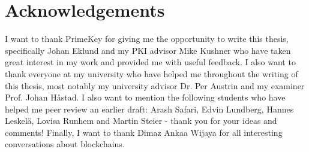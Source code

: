 \ifbook
\clearpage
\fi
\section*{Acknowledgements}
I want to thank PrimeKey for giving me the opportunity to write this thesis, specifically Johan Eklund and my PKI advisor Mike Kushner who have taken great interest in my work and provided me with useful feedback. I also want to thank everyone at my university who have helped me throughout the writing of this thesis, most notably my university advisor Dr. Per Austrin and my examiner Prof. Johan Håstad. I also want to mention the following students who have helped me peer review an earlier draft: Arash Safari, Edvin Lundberg, Hannes Leskelä, Lovisa Runhem and Martin Steier - thank you for your ideas and comments! Finally, I want to thank Dimaz Ankaa Wijaya for all interesting conversations about blockchains. 